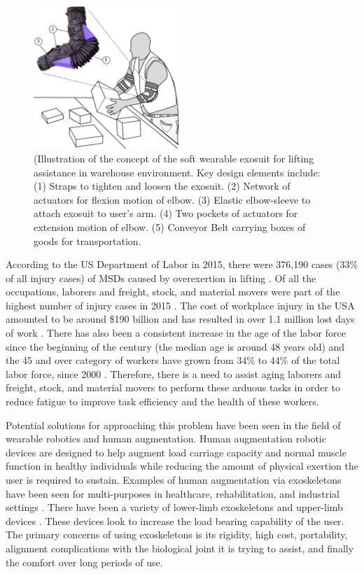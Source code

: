 \documentclass[letterpaper, 10 pt, conference]{ieeeconf}  %
\begin{document}
\begin{figure}[t!]
\centering
\includegraphics[width=0.5\textwidth]{Concept.PNG}
\caption{(Illustration of the concept of the soft wearable exosuit for lifting assistance in warehouse environment. Key design elements include: (1) Straps to tighten and loosen the exosuit. (2) Network of actuators for flexion motion of elbow.  (3) Elastic elbow-sleeve to attach exosuit to user’s arm. (4) Two pockets of actuators for extension motion of elbow. (5) Conveyor Belt carrying boxes of goods for transportation.}
\label{fig:concept}
\end{figure}

According to the US Department of Labor in 2015, there were 376,190 cases (33\% of all injury cases) of MSDs caused by overexertion in lifting \cite{BLS2016}. Of all the occupations, laborers and freight, stock, and material movers were part of the highest number of injury cases in 2015 \cite{BLS2016}. The cost of workplace injury in the USA amounted to be around \$190 billion and has resulted in over 1.1 million lost days of work \cite{Leigh2011}. There has also been a consistent increase in the age of the labor force since the beginning of the century (the median age is around 48 years old) and the 45 and over category of workers have grown from 34\% to 44\% of the total labor force, since 2000 \cite{Mislinski2017}. Therefore, there is a need to assist aging laborers and freight, stock, and material movers to perform these arduous tasks in order to reduce fatigue to improve task efficiency and the health of these workers. 

Potential solutions for approaching this problem have been seen in the field of wearable robotics and human augmentation. Human augmentation robotic devices are designed to help augment load carriage capacity and normal muscle function in healthy individuals while reducing the amount of physical exertion the user is required to sustain. Examples of human augmentation via exoskeletons have been seen for multi-purposes in healthcare, rehabilitation, and industrial settings \cite{Kazerooni2008}. There have been a variety of lower-limb exoskeletons \cite{Viteckova2013} and upper-limb devices \cite{Gopura2016}. These devices look to increase the load bearing capability of the user. The primary concerns of using exoskeletons is its rigidity, high cost, portability, alignment complications with the biological joint it is trying to assist, and finally the comfort over long periods of use.
\end{document}
